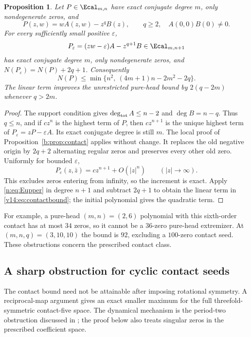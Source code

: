 \documentclass[UTF8,11pt]{ctexart}
\newtheorem{prop}[thm]{Proposition}
\theoremstyle{definition}
\numberwithin{equation}{section}
\begin{document}
\begin{prop}\label{v14:prop:purecontact}
Let $P\in\Ecal_{m,n}$ have exact conjugate degree $m$, only
nondegenerate zeros, and
\[
 P(z,w)=wA(z,w)-z^qB(z),\qquad
 q\ge2,\quad A(0,0)B(0)\ne0.
\]
For every sufficiently small positive $\varepsilon$,
\[
 P_\varepsilon=(zw-\varepsilon)A-z^{q+1}B
 \in\Ecal_{m,n+1}
\]
has exact conjugate degree $m$, only nondegenerate zeros, and
$N(P_\varepsilon)=N(P)+2q+1$. Consequently
\begin{equation}\label{v14:eq:contactbound}
 N(P)\le\min\{n^2,\ (4m+1)n-2m^2-2q\}.
\end{equation}
The linear term improves the unrestricted pure-head bound by
$2(q-2m)$ whenever $q>2m$.
\end{prop}
\begin{proof}
The support condition gives $\deg_{\rm tot}A\le n-2$ and
$\deg B=n-q$. Thus $q\le n$, and if $cz^n$ is the highest
term of $P$, then $cz^{n+1}$ is the unique highest term of
$P_\varepsilon=zP-\varepsilon A$. Its exact conjugate degree
is still $m$. The local proof of Proposition~\ref{b:prop:contact}
applies without change. It replaces the old negative origin by
$2q+2$ alternating regular zeros and preserves every other old
zero. Uniformly for bounded $\varepsilon$,
\[
 P_\varepsilon(z,\bar z)=cz^{n+1}+O(|z|^n)
 \qquad(|z|\to\infty).
\]
This excludes zeros entering from infinity, so the increment is
exact. Apply \eqref{n:eq:Eupper} in degree $n+1$ and subtract
$2q+1$ to obtain the linear term in
\eqref{v14:eq:contactbound}; the initial polynomial gives the
quadratic term.
\end{proof}

For example, a pure-head $(m,n)=(2,6)$ polynomial with this
sixth-order contact has at most $34$ zeros, so it cannot be
a $36$-zero pure-head extremizer. At $(m,n,q)=(3,10,10)$
the bound is $92$, excluding a $100$-zero contact seed.
These obstructions concern the prescribed contact class.

\subsection{A sharp obstruction for cyclic contact seeds}
\label{v23:sec:cycliccontact}

The contact bound need not be attainable after imposing rotational
symmetry. A reciprocal-map argument gives an exact smaller maximum
for the full threefold-symmetric contact-five space. The dynamical
mechanism is the period-two obstruction discussed in
\cite[Section~3, \av, pp.~8--9]{KLP24}; the proof below also treats
singular zeros in the prescribed coefficient space.
\end{document}
